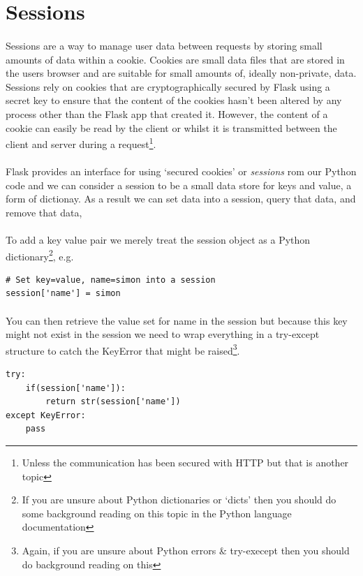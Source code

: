 \documentclass[12pt, a4paper, oneside]{book}
\begin{document}
{\section{Sessions}
\label{sessions}
\paragraph{} Sessions are a way to manage user data between requests by storing small amounts of data within a cookie. Cookies are small data files that are stored in the users browser and are suitable for small amounts of, ideally non-private, data. Sessions rely on cookies that are cryptographically secured by Flask using a secret key to ensure that the content of the cookies hasn't been altered by any process other than the Flask app that created it. However, the content of a cookie can easily be read by the client or whilst it is transmitted between the client and server during a request\footnote{Unless the communication has been secured with HTTP but that is another topic}.

\paragraph{} Flask provides an interface for using `secured cookies' or \emph{sessions} rom our Python code and we can consider a session to be a small data store for keys and value, a form of dictionay. As a result we can set data into a session, query that data, and remove that data, 

\paragraph{} To add a key value pair we merely treat the session object as a Python dictionary\footnote{If you are unsure about Python dictionaries or `dicts' then you should do some background reading on this topic in the Python language documentation}, e.g.
\begin{lstlisting}
# Set key=value, name=simon into a session
session['name'] = simon
\end{lstlisting}

\paragraph{} You can then retrieve the value set for name in the session but because this key might not exist in the session we need to wrap everything in a try-except structure to catch the KeyError that might be raised\footnote{Again, if you are unsure about Python errors \& try-execept then you should do background reading on this}.
\begin{lstlisting}
try:
    if(session['name']):
        return str(session['name'])
except KeyError:
    pass
\end{lstlisting}

}
\end{document}
